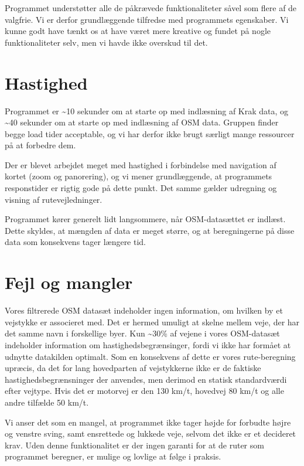 Programmet understøtter alle de påkrævede funktionaliteter såvel som flere af de valgfrie. Vi er derfor grundlæggende tilfredse med programmets egenskaber. Vi kunne godt have tænkt os at have været mere kreative og fundet på nogle funktionaliteter selv, men vi havde ikke overskud til det.

\section{Hastighed}
\label{sec:hastighed}

Programmet er \textasciitilde10 sekunder om at starte op med indlæsning af Krak data, og \textasciitilde40 sekunder om at starte op med indlæsning af OSM data. Gruppen finder begge load tider acceptable, og vi har derfor ikke brugt særligt mange ressourcer på at forbedre dem.

Der er blevet arbejdet meget med hastighed i forbindelse med navigation af kortet (zoom og panorering), og vi mener grundlæggende, at programmets responstider er rigtig gode på dette punkt. Det samme gælder udregning og visning af rutevejledninger.

Programmet kører generelt lidt langsommere, når OSM-datasættet er indlæst. Dette skyldes, at mængden af data er meget større, og at beregningerne på disse data som konsekvens tager længere tid.

\section{Fejl og mangler}
\label{sec:fejlOgMangler}

Vores filtrerede OSM datasæt indeholder ingen information, om hvilken by et vejstykke er associeret med. Det er hermed umuligt at skelne mellem veje, der har det samme navn i forskellige byer. Kun \textasciitilde30\% af vejene i vores OSM-datasæt indeholder information om hastighedsbegrænsinger, fordi vi ikke har formået at udnytte datakilden optimalt. Som en konsekvens af dette er vores rute-beregning upræcis, da det for lang hovedparten af vejstykkerne ikke er de faktiske hastighedsbegrænsninger der anvendes, men derimod en statisk standardværdi efter vejtype. Hvis det er motorvej er den 130 km/t, hovedvej 80 km/t og alle andre tilfælde 50 km/t. 

Vi anser det som en mangel, at programmet ikke tager højde for forbudte højre og venstre sving, samt ensrettede og lukkede veje, selvom det ikke er et decideret krav. Uden denne funktionalitet er der ingen garanti for at de ruter som programmet beregner, er mulige og lovlige at følge i praksis.

